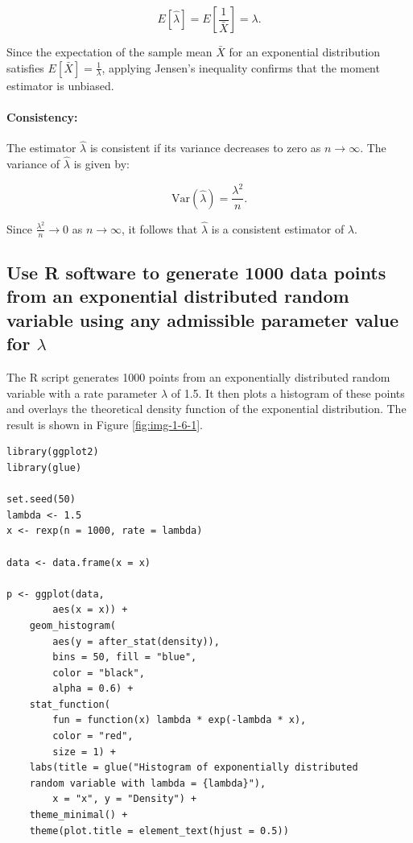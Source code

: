 \documentclass[]{article}
\begin{document}
\begin{equation}
	E[\hat{\lambda}] = E\left[\frac{1}{\bar{X}}\right] = \lambda.
\end{equation}

Since the expectation of the sample mean $\bar{X}$ for an exponential distribution satisfies $E[\bar{X}] = \frac{1}{\lambda}$, applying Jensen's inequality confirms that the moment estimator is unbiased.

\paragraph{Consistency:} The estimator $\hat{\lambda}$ is consistent if its variance decreases to zero as $n \to \infty$. The variance of $\hat{\lambda}$ is given by:

\begin{equation}
	\text{Var}(\hat{\lambda}) = \frac{\lambda^2}{n}.
\end{equation}

Since $\frac{\lambda^2}{n} \to 0$ as $n \to \infty$, it follows that $\hat{\lambda}$ is a consistent estimator of $\lambda$.

	

\subsection{Use R software to generate 1000 data points from an exponential distributed random variable using
	any admissible parameter value for $\lambda$}

The R script generates 1000 points from an exponentially distributed random variable with a rate parameter $\lambda$ of 1.5. It then plots a histogram of these points and overlays the theoretical density function of the exponential distribution. The result is shown in Figure \ref{fig:img-1-6-1}.

\bigskip

\begin{lstlisting}
library(ggplot2)
library(glue)

set.seed(50)
lambda <- 1.5
x <- rexp(n = 1000, rate = lambda)

data <- data.frame(x = x)

p <- ggplot(data,
		aes(x = x)) +
	geom_histogram(
		aes(y = after_stat(density)),
		bins = 50, fill = "blue",
		color = "black",
		alpha = 0.6) +
	stat_function(
		fun = function(x) lambda * exp(-lambda * x),
		color = "red",
		size = 1) +
	labs(title = glue("Histogram of exponentially distributed 
	random variable with lambda = {lambda}"),
		x = "x", y = "Density") +
	theme_minimal() +
	theme(plot.title = element_text(hjust = 0.5))
\end{lstlisting}
\end{document}
